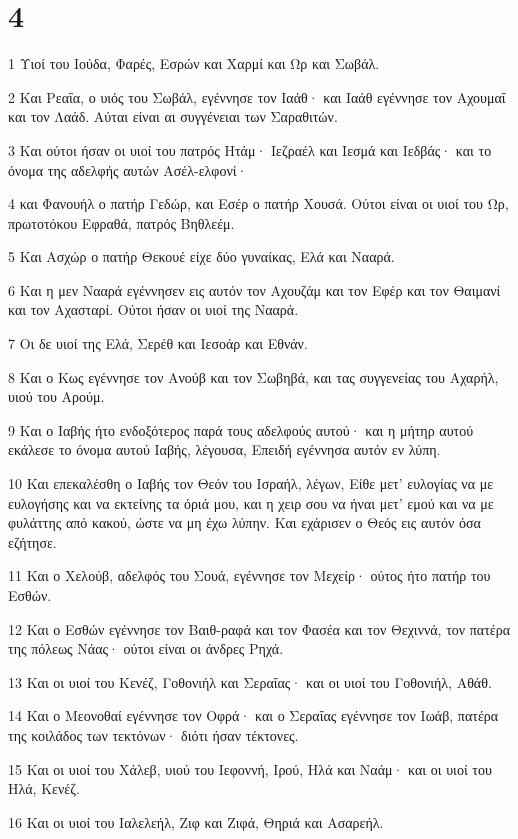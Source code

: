 \chapter{4}

\par 1 Υιοί του Ιούδα, Φαρές, Εσρών και Χαρμί και Ωρ και Σωβάλ.
\par 2 Και Ρεαΐα, ο υιός του Σωβάλ, εγέννησε τον Ιαάθ· και Ιαάθ εγέννησε τον Αχουμαΐ και τον Λαάδ. Αύται είναι αι συγγένειαι των Σαραθιτών.
\par 3 Και ούτοι ήσαν οι υιοί του πατρός Ητάμ· Ιεζραέλ και Ιεσμά και Ιεδβάς· και το όνομα της αδελφής αυτών Ασέλ-ελφονί·
\par 4 και Φανουήλ ο πατήρ Γεδώρ, και Εσέρ ο πατήρ Χουσά. Ούτοι είναι οι υιοί του Ωρ, πρωτοτόκου Εφραθά, πατρός Βηθλεέμ.
\par 5 Και Ασχώρ ο πατήρ Θεκουέ είχε δύο γυναίκας, Ελά και Νααρά.
\par 6 Και η μεν Νααρά εγέννησεν εις αυτόν τον Αχουζάμ και τον Εφέρ και τον Θαιμανί και τον Αχασταρί. Ούτοι ήσαν οι υιοί της Νααρά.
\par 7 Οι δε υιοί της Ελά, Σερέθ και Ιεσοάρ και Εθνάν.
\par 8 Και ο Κως εγέννησε τον Ανούβ και τον Σωβηβά, και τας συγγενείας του Αχαρήλ, υιού του Αρούμ.
\par 9 Και ο Ιαβής ήτο ενδοξότερος παρά τους αδελφούς αυτού· και η μήτηρ αυτού εκάλεσε το όνομα αυτού Ιαβής, λέγουσα, Επειδή εγέννησα αυτόν εν λύπη.
\par 10 Και επεκαλέσθη ο Ιαβής τον Θεόν του Ισραήλ, λέγων, Είθε μετ' ευλογίας να με ευλογήσης και να εκτείνης τα όριά μου, και η χειρ σου να ήναι μετ' εμού και να με φυλάττης από κακού, ώστε να μη έχω λύπην. Και εχάρισεν ο Θεός εις αυτόν όσα εζήτησε.
\par 11 Και ο Χελούβ, αδελφός του Σουά, εγέννησε τον Μεχείρ· ούτος ήτο πατήρ του Εσθών.
\par 12 Και ο Εσθών εγέννησε τον Βαιθ-ραφά και τον Φασέα και τον Θεχιννά, τον πατέρα της πόλεως Νάας· ούτοι είναι οι άνδρες Ρηχά.
\par 13 Και οι υιοί του Κενέζ, Γοθονιήλ και Σεραΐας· και οι υιοί του Γοθονιήλ, Αθάθ.
\par 14 Και ο Μεονοθαί εγέννησε τον Οφρά· και ο Σεραΐας εγέννησε τον Ιωάβ, πατέρα της κοιλάδος των τεκτόνων· διότι ήσαν τέκτονες.
\par 15 Και οι υιοί του Χάλεβ, υιού του Ιεφοννή, Ιρού, Ηλά και Ναάμ· και οι υιοί του Ηλά, Κενέζ.
\par 16 Και οι υιοί του Ιαλελεήλ, Ζιφ και Ζιφά, Θηριά και Ασαρεήλ.
